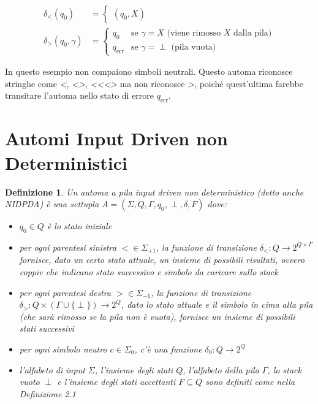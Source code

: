 \documentclass[a4paper,12pt]{report}
\newtheorem{definition}{Definizione}[chapter]
\theoremstyle{propositionstyle}
\begin{document}
    \begin{align}
        \delta_{<}(q_0) &= \begin{cases}
        (q_0, X)
        \end{cases} \\[1em]
        \delta_{>}(q_0, \gamma) &= \begin{cases}
            q_0 & \text{se } \gamma = X \text{ (viene rimosso } X \text{ dalla pila)} \\
            q_{\text{err}} & \text{se } \gamma = \perp \text{ (pila vuota)}
        \end{cases}
    \end{align}

    In questo esempio non compaiono simboli neutrali.
    Questo automa riconosce stringhe come \textit{<}, \textit{<>}, \textit{<{<}<>} ma non riconosce \textit{>}, poiché quest'ultima farebbe transitare l'automa nello stato di errore $q_{\text{err}}$.

    \section{Automi Input Driven non Deterministici}

    \begin{definition}
        Un \textit{automa a pila input driven non deterministico} (detto anche NIDPDA) è una settupla $A = (\Sigma, Q, \Gamma, q_0, \perp, \delta, F)$ dove:
        \begin{itemize}
            \item $q_{0} \in Q$ è lo stato iniziale
            \item per ogni parentesi sinistra $< \in \Sigma_{+1}$, la funzione di transizione $\delta_{<} : Q \rightarrow 2^{Q \times \Gamma}$ fornisce, dato un certo stato attuale, un insieme di possibili risultati, ovvero coppie che indicano stato successivo e simbolo da caricare sullo stack
            \item per ogni parentesi destra $> \in \Sigma_{-1}$, la funzione di transizione $\delta_{>} : Q \times (\Gamma \cup \{\perp\}) \rightarrow 2^Q$, dato lo stato attuale e il simbolo in cima alla pila (che sarà rimosso se la pila non è vuota), fornisce un insieme di possibili stati successivi %
            \item per ogni simbolo neutro $c \in \Sigma_{0}$, c'è una funzione $\delta_{0} : Q \rightarrow 2^Q$
            \item l'alfabeto di input $\Sigma$, l'insieme degli stati $Q$, l'alfabeto della pila $\Gamma$, lo stack vuoto $\perp$ e l'insieme degli stati accettanti $F \subseteq Q$ sono definiti come nella Definizione 2.1
        \end{itemize}
    \end{definition}
\end{document}
